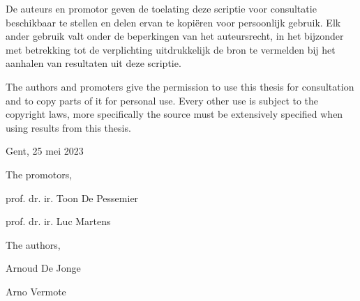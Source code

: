 

\par\vspace*{\fill}

De auteurs en promotor geven de toelating deze scriptie voor consultatie beschikbaar te stellen en delen ervan te kopi\"eren voor persoonlijk gebruik. Elk ander gebruik valt onder de beperkingen van het auteursrecht, in het bijzonder met betrekking tot de verplichting uitdrukkelijk de bron te vermelden bij het aanhalen van resultaten uit deze scriptie.

The authors and promoters give the permission to use this thesis for consultation and to copy parts of it for personal use. Every other use is subject to the copyright laws, more specifically the source must be extensively specified when using results from this thesis.

\vspace{1cm}

Gent, 25 mei 2023

\vspace{1cm}

\begin{minipage}[t][4cm][t]{0.5\textwidth}
\raggedright
The promotors,

\vspace{2.5cm}

prof. dr. ir. Toon De Pessemier

prof. dr. ir. Luc Martens
\end{minipage}
\begin{minipage}[t][4cm][t]{0.48\textwidth}
\raggedright
The authors,

\vspace{2.5cm}

Arnoud De Jonge

Arno Vermote
\end{minipage}

\thispagestyle{empty}

